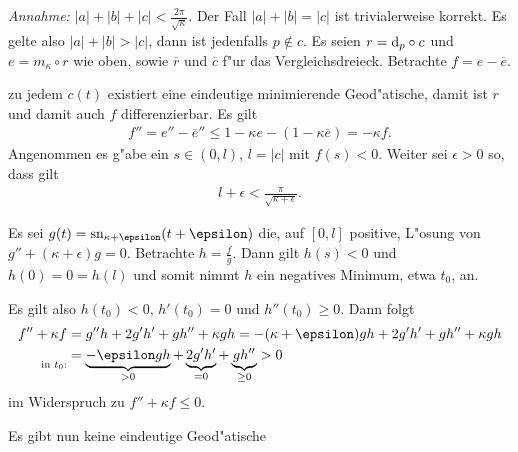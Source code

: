 \begin{emptythm}
\emph{Annahme:} $|a| + |b| + |c| < \frac{2\pi}{\sqrt{\kappa}}$.
Der Fall $|a| + |b| = |c|$ ist trivialerweise korrekt.
Es gelte also $|a| + |b| > |c|$, dann ist jedenfalls $p \notin c$.
Es seien $r = \mathrm{d}_p \circ c$ und $e = m_{\kappa} \circ r$ wie oben, sowie $\overline r$ und $\overline c$ f"ur das Vergleichsdreieck.
Betrachte $f = e - \overline e$.
\begin{description}[font=\normalfont\bfseries]
\item[Fall 1:] zu jedem $c(t)$ existiert eine eindeutige minimierende Geod"atische, damit ist $r$ und damit auch $f$ differenzierbar.
	Es gilt
	\begin{align*}
		f'' = e'' - \overline e''
		\leq 1 - \kappa e - (1-\kappa \overline e) = -\kappa f.
	\end{align*}
	Angenommen es g"abe ein $s \in (0,l)$, $l = |c|$ mit $f(s) < 0$.
	Weiter sei $\epsilon > 0$ so, dass gilt
	\begin{align*}
		l + \epsilon < \frac{\pi}{\sqrt{\kappa + \epsilon}}.
	\end{align*}
	
	Es sei $g(t) = \sn_{\kappa + \epsilon}(t + \epsilon)$ die, auf $[0,l]$ positive, L"osung von $g'' +(\kappa + \epsilon)g = 0$.
	Betrachte $h = \frac{f}{g}$.
	Dann gilt $h(s) < 0$ und $h(0) = 0 = h(l)$ und somit nimmt $h$ ein negatives Minimum, etwa $t_0$, an.
	
	Es gilt also $h(t_0) < 0$, $h'(t_0) = 0$ und $h''(t_0) \geq 0$.
	Dann folgt
	\begin{align*}
		f'' + \kappa f & = g'' h + 2 g'h' + gh'' + \kappa g h = -(\kappa + \epsilon)gh + 2 g'h' + gh'' + \kappa g h\\
		\underset{\text{in } t_0:}{\hphantom{}} & = \underbrace{-\epsilon g h}_{> 0} + \underbrace{2 g' h'}_{= 0} + \underbrace{gh''}_{\geq 0} > 0
	\end{align*}
	im Widerspruch zu $f'' + \kappa f \leq 0$.
\item[Fall 1 gilt nicht:] Es gibt nun keine eindeutige Geod"atische
\begin{center}
\end{center}
\end{description}
\end{emptythm}
